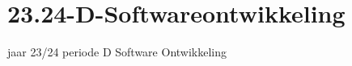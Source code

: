 \chapter{23.24-\/D-\/\+Softwareontwikkeling}
\hypertarget{md__r_e_a_d_m_e}{}\label{md__r_e_a_d_m_e}
\label{md__r_e_a_d_m_e_autotoc_md0}%
%
jaar 23/24 periode D Software Ontwikkeling 